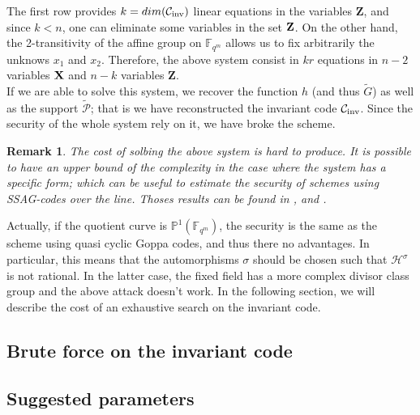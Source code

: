 \documentclass[10pt]{article}
\newtheorem{rq1}{Remark}[]
\newcommand{\s}{\vspace{0.3cm}}
\newcommand{\fqm}{\mathbb{F}_{q^m}}
\newcommand{\PR}{\mathcal{P}}
\begin{document}
The first row provides $k=dim(\mathcal{C}_{\rm{inv}})$ linear equations in the variables $\textbf{Z}$, and since $k < n$, one can eliminate some variables in the set $\bf{Z}$. On the other hand, the 2-transitivity of the affine group on $\fqm$ allows us to fix arbitrarily the unknows $x_1$ and $x_2$. Therefore, the above system consist in $kr$ equations in $n-2$ variables $\bf{X}$ and $n-k$ variables $\textbf{Z}$. \\
If we are able to solve this system, we recover the function $h$ (and thus $\tilde{G}$) as well as the support $\tilde{\PR}$; that is we have reconstructed the invariant code $\mathcal{C}_{\rm inv}$. Since the security of the whole system rely on it, we have broke the scheme.  

\s

\begin{rq1}
The cost of solbing the above system is hard to produce. It is possible to have an upper bound of the complexity in the case where the system has a specific form; which can be useful to estimate the security of schemes using SSAG-codes over the line. Thoses results can be found in \cite{FOP}, \cite{FOP1} and \cite{FOP2}. 
\end{rq1}

Actually, if the quotient curve is $\mathbb{P}^1(\fqm)$, the security is the same as the scheme using quasi cyclic Goppa codes, and thus there no advantages. In particular, this means that the automorphisms $\sigma$ should be chosen such that $\mathcal{H}^{\sigma}$ is not rational. In the latter case, the fixed field has a more complex divisor class group and the above attack doesn't work. In the following section, we will describe the cost of an exhaustive search on the invariant code.

\s

\subsection{Brute force on the invariant code}

\s

\subsection{Suggested parameters}



























\newpage


\end{document}
